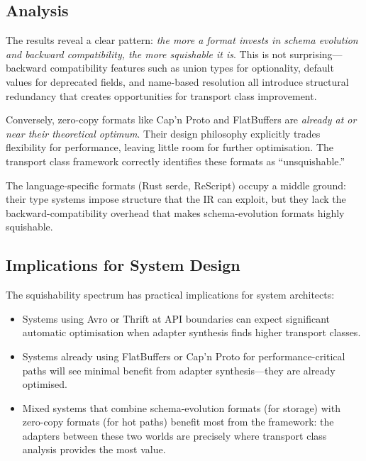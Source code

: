 \documentclass[11pt,a4paper]{article}
\theoremstyle{definition}
\theoremstyle{remark}
\begin{document}
\subsection{Analysis}

The results reveal a clear pattern: \emph{the more a format invests
in schema evolution and backward compatibility, the more squishable
it is}. This is not surprising---backward compatibility features such
as union types for optionality, default values for deprecated fields,
and name-based resolution all introduce structural redundancy that
creates opportunities for transport class improvement.

Conversely, zero-copy formats like Cap'n Proto and FlatBuffers are
\emph{already at or near their theoretical optimum}. Their design
philosophy explicitly trades flexibility for performance, leaving
little room for further optimisation. The transport class framework
correctly identifies these formats as ``unsquishable.''

The language-specific formats (Rust serde, ReScript) occupy a middle
ground: their type systems impose structure that the IR can exploit,
but they lack the backward-compatibility overhead that makes
schema-evolution formats highly squishable.

\subsection{Implications for System Design}

The squishability spectrum has practical implications for system
architects:

\begin{itemize}[leftmargin=*]
  \item Systems using Avro or Thrift at API boundaries can expect
    significant automatic optimisation when adapter synthesis finds
    higher transport classes.
  \item Systems already using FlatBuffers or Cap'n Proto for
    performance-critical paths will see minimal benefit from adapter
    synthesis---they are already optimised.
  \item Mixed systems that combine schema-evolution formats (for
    storage) with zero-copy formats (for hot paths) benefit most
    from the framework: the adapters between these two worlds are
    precisely where transport class analysis provides the most value.
\end{itemize}

\end{document}
